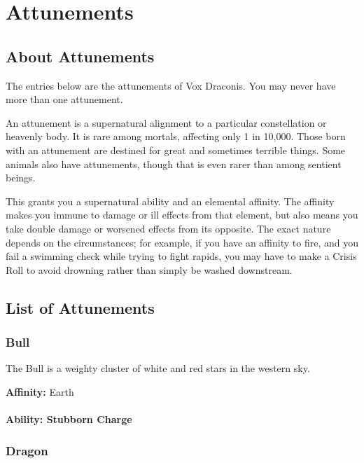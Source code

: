 \chapter{Attunements}

\begin{multicols}{2}

\section{About Attunements}

The entries below are the attunements of Vox Draconis. You may 
never have more than one attunement.

An attunement is a supernatural alignment to a particular 
constellation or heavenly body. It is rare among mortals, 
affecting only 1 in 10,000. Those born with an attunement 
are destined for great and sometimes terrible things. Some 
animals also have attunements, though that is even rarer than 
among sentient beings.

This grants you a supernatural ability and an elemental affinity.
The affinity  makes you immune to damage or
ill effects from that element, but also means you take double
damage or worsened effects from its opposite. The exact nature
depends on the circumstances; for example, if you have an
affinity to fire, and you fail a swimming check while trying to fight
rapids, you may have to make a Crisis Roll to avoid drowning
rather than simply be washed downstream.

\section{List of Attunements}

\subsection{Bull}

The Bull is a weighty cluster of white and red stars in
the western sky.

\textbf{Affinity:} Earth

\subsubsection{Ability: Stubborn Charge}

\subsection{Dragon}


\end{multicols}
